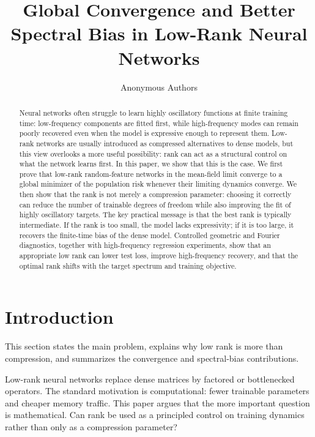 \documentclass{article}
\title{Global Convergence and Better Spectral Bias in Low-Rank Neural Networks}
\author{Anonymous Authors}
\begin{document}
\maketitle

\begin{abstract}
Neural networks often struggle to learn highly oscillatory functions at finite training time: low-frequency components are fitted first, while high-frequency modes can remain poorly recovered even when the model is expressive enough to represent them. Low-rank networks are usually introduced as compressed alternatives to dense models, but this view overlooks a more useful possibility: rank can act as a structural control on what the network learns first. In this paper, we show that this is the case. We first prove that low-rank random-feature networks in the mean-field limit converge to a global minimizer of the population risk whenever their limiting dynamics converge. We then show that the rank is not merely a compression parameter: choosing it correctly can reduce the number of trainable degrees of freedom while also improving the fit of highly oscillatory targets. The key practical message is that the best rank is typically intermediate. If the rank is too small, the model lacks expressivity; if it is too large, it recovers the finite-time bias of the dense model. Controlled geometric and Fourier diagnostics, together with high-frequency regression experiments, show that an appropriate low rank can lower test loss, improve high-frequency recovery, and that the optimal rank shifts with the target spectrum and training objective.
\end{abstract}

\section{Introduction}
\label{sec:introduction}

This section states the main problem, explains why low rank is more than compression, and summarizes the convergence and spectral-bias contributions.

Low-rank neural networks replace dense matrices by factored or bottlenecked operators. The standard motivation is computational: fewer trainable parameters and cheaper memory traffic. This paper argues that the more important question is mathematical. Can rank be used as a principled control on training dynamics rather than only as a compression parameter?
\end{document}
